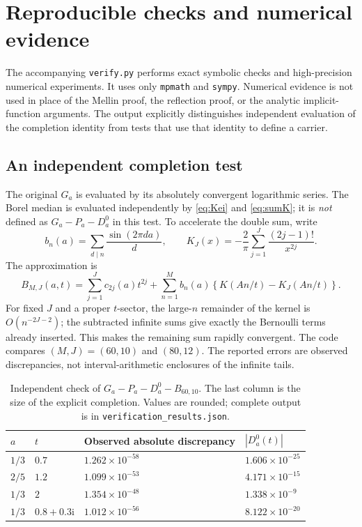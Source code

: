 \documentclass[11pt,a4paper]{article}
\numberwithin{equation}{section}
\theoremstyle{definition}
\theoremstyle{remark}
\newcommand{\ii}{\mathrm i}
\begin{document}
\section{Reproducible checks and numerical evidence}
\label{sec:numerics}

The accompanying \texttt{verify.py} performs exact symbolic checks and
high-precision numerical experiments. It uses only \texttt{mpmath}
and \texttt{sympy}. Numerical evidence is not used in place of the
Mellin proof, the reflection proof, or the analytic implicit-function
arguments. The output explicitly distinguishes independent evaluation
of the completion identity from tests that use that identity to define
a carrier.

\subsection{An independent completion test}
The original $G_a$ is evaluated by its absolutely convergent
logarithmic series. The Borel median is evaluated independently by
\eqref{eq:Kei} and \eqref{eq:sumK}; it is \emph{not} defined as
$G_a-P_a-D_a^0$ in this test. To accelerate the double sum, write
\begin{equation}
 b_n(a)=\sum_{d\mid n}\frac{\sin(2\pi da)}d,
 \qquad
 K_J(x)=-\frac2\pi\sum_{j=1}^{J}\frac{(2j-1)!}{x^{2j}}.
 \label{eq:Ktrunc}
\end{equation}
The approximation is
\begin{equation}
 B_{M,J}(a,t)=\sum_{j=1}^{J}c_{2j}(a)t^{2j}
 +\sum_{n=1}^{M}b_n(a)
       \left\{K(An/t)-K_J(An/t)\right\}.
 \label{eq:acceleration}
\end{equation}
For fixed $J$ and a proper $t$-sector, the large-$n$ remainder of the
kernel is $O(n^{-2J-2})$; the subtracted infinite sums give exactly the
Bernoulli terms already inserted. This makes the remaining sum
rapidly convergent. The code compares $(M,J)=(60,10)$ and $(80,12)$.
The reported errors are observed discrepancies, not interval-arithmetic
enclosures of the infinite tails.

\begin{table}[htbp]
\centering
\caption{Independent check of $G_a-P_a-D_a^0-B_{60,10}$.
The last column is the size of the explicit completion. Values are
rounded; complete output is in \texttt{verification\_results.json}.}
\label{tab:identity}
\begin{tabular}{@{}llll@{}}
\toprule
$a$ & $t$ & Observed absolute discrepancy & $|D_a^0(t)|$\\
\midrule
$1/3$ & $0.7$ & $1.262\times10^{-58}$ & $1.606\times10^{-25}$\\
$2/5$ & $1.2$ & $1.099\times10^{-53}$ & $4.171\times10^{-15}$\\
$1/3$ & $2$ & $1.354\times10^{-48}$ & $1.338\times10^{-9}$\\
$1/3$ & $0.8+0.3\ii$ & $1.012\times10^{-56}$ & $8.122\times10^{-20}$\\
\bottomrule
\end{tabular}
\end{table}
\end{document}
